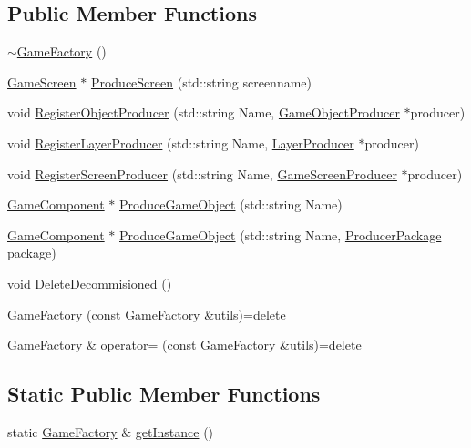 \subsection*{Public Member Functions}
\begin{DoxyCompactItemize}
\item 
\hyperlink{class_game_factory_a0cbbb4c198cab19386d67bfe7891b785}{$\sim$\-Game\-Factory} ()
\item 
\hyperlink{class_game_screen}{Game\-Screen} $\ast$ \hyperlink{class_game_factory_ad293f5a8811d9106753916cef819fbce}{Produce\-Screen} (std\-::string screenname)
\item 
void \hyperlink{class_game_factory_a77df8b5e97869b7d7b667c0852191e20}{Register\-Object\-Producer} (std\-::string Name, \hyperlink{class_game_object_producer}{Game\-Object\-Producer} $\ast$producer)
\item 
void \hyperlink{class_game_factory_a3a20ae04c8ff992ad080b9742f5831c0}{Register\-Layer\-Producer} (std\-::string Name, \hyperlink{class_layer_producer}{Layer\-Producer} $\ast$producer)
\item 
void \hyperlink{class_game_factory_ad3c85f8654dd2c3aeb7a2b17df05cceb}{Register\-Screen\-Producer} (std\-::string Name, \hyperlink{class_game_screen_producer}{Game\-Screen\-Producer} $\ast$producer)
\item 
\hyperlink{class_game_component}{Game\-Component} $\ast$ \hyperlink{class_game_factory_a521cf5410b97240789a9cc54404d6a2f}{Produce\-Game\-Object} (std\-::string Name)
\item 
\hyperlink{class_game_component}{Game\-Component} $\ast$ \hyperlink{class_game_factory_a0ed92342411d80d6080294c29ac2c54e}{Produce\-Game\-Object} (std\-::string Name, \hyperlink{class_producer_package}{Producer\-Package} package)
\item 
void \hyperlink{class_game_factory_a7a130a6b0bff752fdd8223616a5f046f}{Delete\-Decommisioned} ()
\item 
\hyperlink{class_game_factory_a694a26c694da014dc5ced9d85a2aaaa1}{Game\-Factory} (const \hyperlink{class_game_factory}{Game\-Factory} \&utils)=delete
\item 
\hyperlink{class_game_factory}{Game\-Factory} \& \hyperlink{class_game_factory_ac9e48fb53d87829930bbc447133d9c25}{operator=} (const \hyperlink{class_game_factory}{Game\-Factory} \&utils)=delete
\end{DoxyCompactItemize}
\subsection*{Static Public Member Functions}
\begin{DoxyCompactItemize}
\item 
static \hyperlink{class_game_factory}{Game\-Factory} \& \hyperlink{class_game_factory_a0b1eef0e66b8f6ff8277f6d5fb4b8e0d}{get\-Instance} ()
\end{DoxyCompactItemize}
